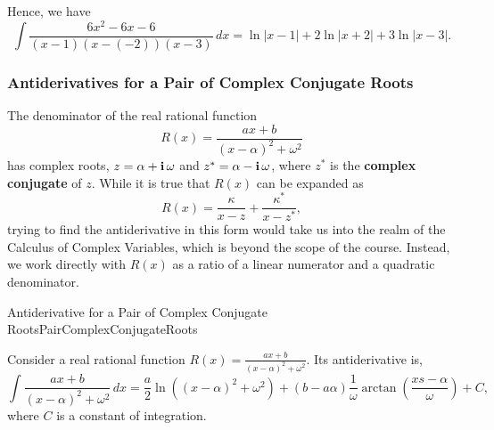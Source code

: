 Hence, we have 
$$ \int \frac{6x^2 - 6x - 6}{(x - 1)(x - (-2))(x - 3)} \, dx = \ln|x-1| + 2 \ln| x+2| + 3 \ln|x-3|.$$
\Qed


\subsubsection{Antiderivatives for a Pair of Complex Conjugate Roots}

The denominator of the real rational function 
$$R(x)=\frac{a x + b}{\left(x - \alpha\right)^2 + \omega^2}$$
has complex roots, $z= \alpha + \mathop{\bm{\mathrm i}} \omega$ and $z^\ast = \alpha - \mathop{\bm{\mathrm i}} \omega $, where $z^\ast$ is the \textbf{complex conjugate} of $z$. While it is true that $R(x)$ can be expanded as
$$R(x) = \frac{\kappa}{x-z} + \frac{\kappa^\ast}{x-z^\ast},$$
trying to find the antiderivative in this form would take us into the realm of the Calculus of Complex Variables, which is beyond the scope of the course. Instead, we work directly with $R(x)$ as a ratio of a linear numerator and a quadratic denominator.

\bigskip

\begin{propColor}{Antiderivative for a Pair of Complex Conjugate Roots}{PairComplexConjugateRoots}

Consider a real rational function $R(x) = \frac{a x + b}{\left(x - \alpha\right)^2 + \omega^2}$. Its antiderivative is,
\begin{equation}
\label{eq:AntiderivativeRationalPairComplexConjugateRoots}
    \int \frac{a x + b}{(x - \alpha)^2 + \omega^2} \, dx = \frac{a}{2} \ln\left((x - \alpha)^2 + \omega^2\right) + \left(b - a\alpha\right) \frac{1}{\omega} \arctan\left(\frac{xs - \alpha}{\omega}\right) + C,
\end{equation}
where $C$ is a constant of integration. 

\end{propColor}

